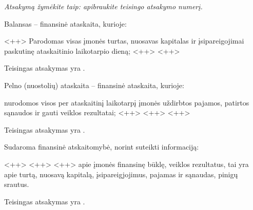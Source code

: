 \begin{tasks}

  \emph{Atsakymą žymėkite taip: apibraukite teisingo atsakymo numerį.}

  \begin{task}
    \begin{condition}
      Balansas – finansinė ataskaita, kurioje:
      \begin{enumerate}
         <++>
         Parodomas visas įmonės turtas, nuosavas kapitalas ir
          įsipareigojimai paskutinę ataskaitinio laikotarpio dieną;
         <++>
         <++>
      \end{enumerate}
    \end{condition}
    \begin{solution}
      Teisingas atsakymas yra .
    \end{solution}
  \end{task}

  \begin{task}
    \begin{condition}
      Pelno (nuostolių) ataskaita – finansinė ataskaita, kurioje:
      \begin{enumerate}
         nurodomos visos per ataskaitinį laikotarpį įmonės
          uždirbtos pajamos, patirtos sąnaudos ir gauti veiklos
          rezultatai;
         <++>
         <++>
         <++>
      \end{enumerate}
    \end{condition}
    \begin{solution}
      Teisingas atsakymas yra .
    \end{solution}
  \end{task}

  \begin{task}
    \begin{condition}
      Sudaroma finansinė atskaitomybė, norint suteikti informaciją:
      \begin{enumerate}
         <++>
         <++>
         <++>
         apie įmonės finansinę būklę, veiklos rezultatus, tai yra
          apie turtą, nuosavą kapitalą, įsipareigjojimus, pajamas ir
          sąnaudas, pinigų srautus.
      \end{enumerate}
    \end{condition}
    \begin{solution}
      Teisingas atsakymas yra .
    \end{solution}
  \end{task}


\end{tasks}
